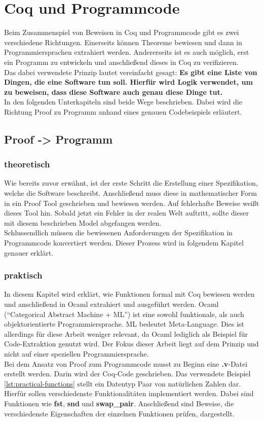 \section{Coq und Programmcode}
\label{s:coq-and-code}

Beim Zusammenspiel von Beweisen in Coq und Programmcode gibt es zwei verschiedene Richtungen. Einerseits können Theoreme bewiesen und dann in Programmiersprachen extrahiert werden. Andererseits ist es auch möglich, erst ein Programm zu entwickeln und anschließend dieses in Coq zu verifizieren. \\
Das dabei verwendete Prinzip lautet vereinfacht gesagt:
\textbf{Es gibt eine Liste von Dingen, die eine Software tun soll. Hierfür wird Logik verwendet, um zu beweisen, dass diese Software auch genau diese Dinge tut.}
\\
In den folgenden Unterkapiteln sind beide Wege beschrieben. Dabei wird die Richtung Proof zu Programm anhand eines genauen Codebeispiels erläutert.

\subsection{Proof -> Programm}
\subsubsection{theoretisch}
{Wie bereits zuvor erwähnt, ist der erste Schritt die Erstellung einer Spezifikation, welche die Software beschreibt. Anschließend muss diese in mathematischer Form in ein Proof Tool geschrieben und bewiesen werden. Auf fehlerhafte Beweise weißt dieses Tool hin.
Sobald jetzt ein Fehler in der realen Welt auftritt, sollte dieser mit diesem beschrieben Model abgefangen werden. \\
Schlussendlich müssen die bewiesenen Anforderungen der Spezifikation in Programmcode konvertiert werden. Dieser Prozess wird in folgendem Kapitel genauer erklärt.}\cite{HELWER01:FV}

\subsubsection{praktisch}
In diesem Kapitel wird erklärt, wie Funktionen formal mit Coq bewiesen werden und anschließend in Ocaml extrahiert und ausgeführt werden. Ocaml ("`Categorical Abstract Machine + ML"') ist eine sowohl funktionale, als auch objektorientierte Programmiersprache. ML bedeutet Meta-Language. Dies ist allerdings für diese Arbeit weniger relevant, da Ocaml lediglich als Beispiel für Code-Extraktion genutzt wird. Der Fokus dieser Arbeit liegt auf dem Prinzip und nicht auf einer speziellen Programmiersprache.\\
Bei dem Ansatz von Proof zum Programmcode musst zu Beginn eine \textbf{.v}-Datei erstellt werden. Darin wird der Coq-Code geschrieben. Das verwendete Beispiel \ref{lst:practical-functions} stellt ein Datentyp Paar von natürlichen Zahlen dar. Hierfür sollen verschiedenste Funktionalitäten implementiert werden. Dabei sind Funktionen wie \textbf{fst}, \textbf{snd} und \textbf{swap\_pair}. Anschließend sind Beweise, die verschiedenste Eigenschaften der einzelnen Funktionen prüfen, dargestellt.


